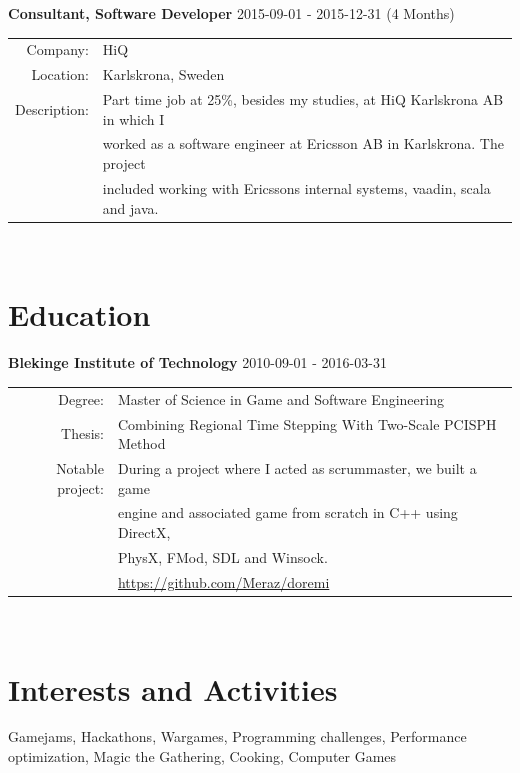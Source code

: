 \documentclass[a4paper,10pt]{article}
\begin{document}
\textbf{Consultant, Software Developer} 2015-09-01 - 2015-12-31 (4 Months) \\
\begin{tabular}{rl}
Company:& HiQ \\
Location:& Karlskrona, Sweden \\
Description:& Part time job at 25\%, besides my studies, at HiQ Karlskrona AB in which I\\&
worked as a software engineer at Ericsson AB in Karlskrona. The project\\&
included working with Ericssons internal systems, vaadin, scala and java.
\end{tabular}\\


\section{Education}
\textbf{Blekinge Institute of Technology} 2010-09-01 - 2016-03-31 \\
\begin{tabular}{rl}
Degree:&  Master of Science in Game and Software Engineering\\
Thesis:& Combining Regional Time Stepping With Two-Scale PCISPH Method \\
Notable project:& During a project where I acted as scrummaster, we built a game\\
& engine and associated game from scratch in C++ using DirectX,\\
& PhysX, FMod, SDL and Winsock.\\
& \url{https://github.com/Meraz/doremi}
\end{tabular}\\

\section{Interests and Activities}
Gamejams, Hackathons, Wargames, Programming challenges, Performance optimization, Magic the Gathering, Cooking, Computer Games
\end{document}
